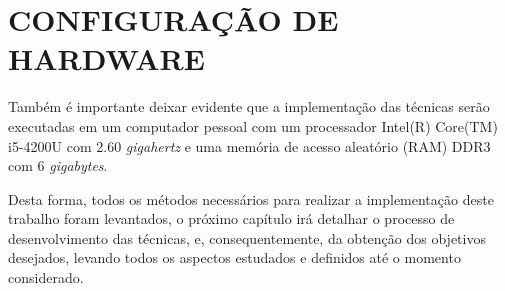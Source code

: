 \section{CONFIGURAÇÃO DE HARDWARE}
Também é importante deixar evidente que a implementação das técnicas serão executadas em um computador pessoal com um processador Intel(R) Core(TM) i5-4200U com 2.60 \textit{gigahertz} e uma memória de acesso aleatório (RAM) DDR3 com 6 \textit{gigabytes}. 

Desta forma, todos os métodos necessários para realizar a implementação deste trabalho foram levantados, o próximo capítulo irá detalhar o processo de desenvolvimento das técnicas, e, consequentemente, da obtenção dos objetivos desejados, levando todos os aspectos estudados e definidos até o momento considerado. 

